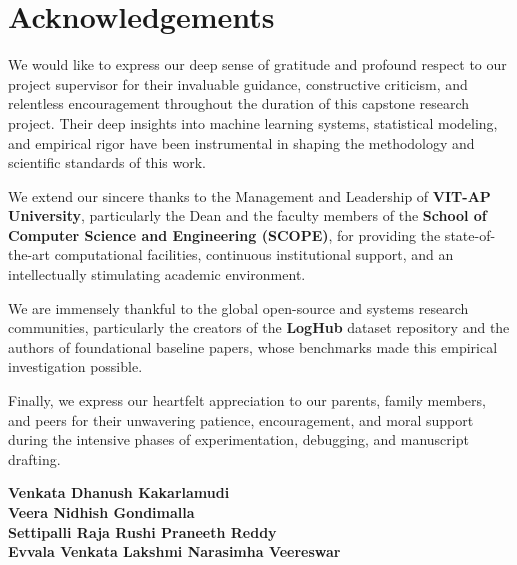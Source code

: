 \chapter*{Acknowledgements}

We would like to express our deep sense of gratitude and profound respect to our project supervisor for their invaluable guidance, constructive criticism, and relentless encouragement throughout the duration of this capstone research project. Their deep insights into machine learning systems, statistical modeling, and empirical rigor have been instrumental in shaping the methodology and scientific standards of this work.

We extend our sincere thanks to the Management and Leadership of \textbf{VIT-AP University}, particularly the Dean and the faculty members of the \textbf{School of Computer Science and Engineering (SCOPE)}, for providing the state-of-the-art computational facilities, continuous institutional support, and an intellectually stimulating academic environment.

We are immensely thankful to the global open-source and systems research communities, particularly the creators of the \textbf{LogHub} dataset repository and the authors of foundational baseline papers, whose benchmarks made this empirical investigation possible. 

Finally, we express our heartfelt appreciation to our parents, family members, and peers for their unwavering patience, encouragement, and moral support during the intensive phases of experimentation, debugging, and manuscript drafting.

\vspace{2.5cm}

\noindent \textbf{Venkata Dhanush Kakarlamudi} \\
\textbf{Veera Nidhish Gondimalla} \\
\textbf{Settipalli Raja Rushi Praneeth Reddy} \\
\textbf{Evvala Venkata Lakshmi Narasimha Veereswar}

